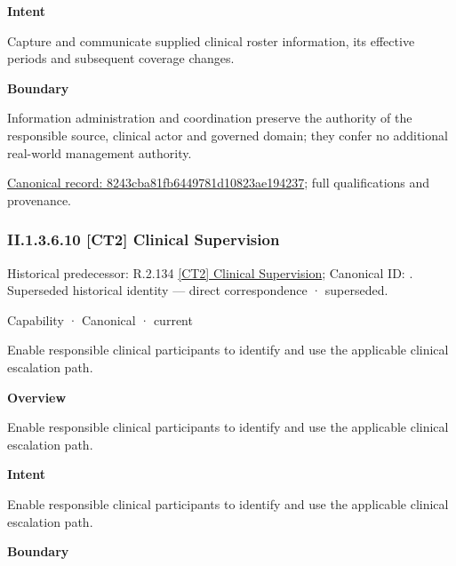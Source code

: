\textbf{Intent}



Capture and communicate supplied clinical roster information, its effective periods and subsequent coverage changes.



\textbf{Boundary}



Information administration and coordination preserve the authority of the responsible source, clinical actor and governed domain; they confer no additional real-world management authority.


{\footnotesize \href{../../../../../../../continuum/strategy/capability/8243cba81fb6449781d10823ae194237.md}{Canonical record: 8243cba81fb6449781d10823ae194237}; full qualifications and provenance.}\par
\subsubsection*{II.1.3.6.10 [CT2] Clinical Supervision}
\label{navigation:II.1.3.6.10}

{\small Historical predecessor: R.2.134 \hyperref[element:50c838981f3946d78e8f78d18e31c70c]{[CT2] Clinical Supervision}; Canonical ID: \texttt{}. Superseded historical identity — direct correspondence · superseded.}\par
\label{element:f697b1ac79b544749315f31819b17969}
{\small Capability · Canonical · current}\par

Enable responsible clinical participants to identify and use the applicable clinical escalation path.



\textbf{Overview}



Enable responsible clinical participants to identify and use the applicable clinical escalation path.



\textbf{Intent}



Enable responsible clinical participants to identify and use the applicable clinical escalation path.



\textbf{Boundary}



